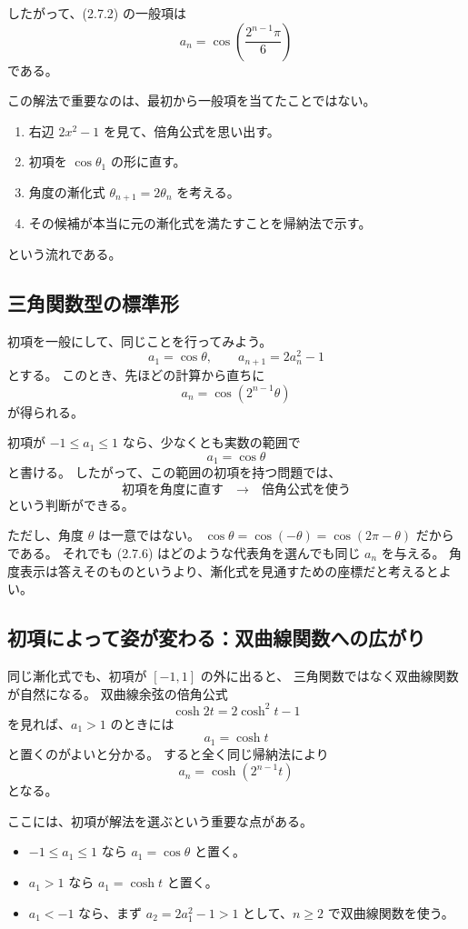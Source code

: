 したがって、(2.7.2) の一般項は
\[
  \boxed{
    a_n=\cos\left(\frac{2^{n-1}\pi}{6}\right)
  }
\]
である。

この解法で重要なのは、最初から一般項を当てたことではない。
\begin{enumerate}
  \item 右辺 $2x^2-1$ を見て、倍角公式を思い出す。
  \item 初項を $\cos\theta_1$ の形に直す。
  \item 角度の漸化式 $\theta_{n+1}=2\theta_n$ を考える。
  \item その候補が本当に元の漸化式を満たすことを帰納法で示す。
\end{enumerate}
という流れである。

\subsection{三角関数型の標準形}

初項を一般にして、同じことを行ってみよう。
\[
  a_1=\cos\theta,
  \qquad
  a_{n+1}=2a_n^2-1
  \tag{2.7.5}
\]
とする。
このとき、先ほどの計算から直ちに
\[
  \boxed{a_n=\cos(2^{n-1}\theta)}
  \tag{2.7.6}
\]
が得られる。

初項が $-1\leq a_1\leq1$ なら、少なくとも実数の範囲で
\[
  a_1=\cos\theta
\]
と書ける。
したがって、この範囲の初項を持つ問題では、
\[
  \text{初項を角度に直す}
  \quad\longrightarrow\quad
  \text{倍角公式を使う}
\]
という判断ができる。

ただし、角度 $\theta$ は一意ではない。
$\cos\theta=\cos(-\theta)=\cos(2\pi-\theta)$ だからである。
それでも (2.7.6) はどのような代表角を選んでも同じ $a_n$ を与える。
角度表示は答えそのものというより、漸化式を見通すための座標だと考えるとよい。

\subsection{初項によって姿が変わる：双曲線関数への広がり}

同じ漸化式でも、初項が $[-1,1]$ の外に出ると、
三角関数ではなく双曲線関数が自然になる。
双曲線余弦の倍角公式
\[
  \cosh 2t=2\cosh^2t-1
  \tag{2.7.7}
\]
を見れば、$a_1>1$ のときには
\[
  a_1=\cosh t
\]
と置くのがよいと分かる。
すると全く同じ帰納法により
\[
  a_n=\cosh(2^{n-1}t)
  \tag{2.7.8}
\]
となる。

ここには、初項が解法を選ぶという重要な点がある。
\begin{itemize}
  \item $-1\leq a_1\leq1$ なら $a_1=\cos\theta$ と置く。
  \item $a_1>1$ なら $a_1=\cosh t$ と置く。
  \item $a_1<-1$ なら、まず $a_2=2a_1^2-1>1$ として、$n\geq2$ で双曲線関数を使う。
\end{itemize}


